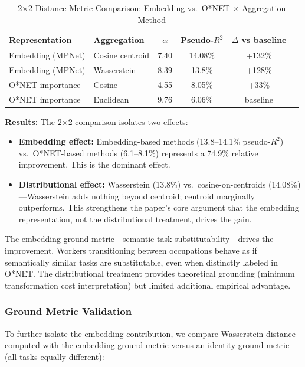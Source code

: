 \documentclass[12pt]{article}
\begin{document}
\begin{table}[h!]
\centering
\caption{2$\times$2 Distance Metric Comparison: Embedding vs.\ O*NET $\times$ Aggregation Method}
\label{tab:2x2-comparison}
\begin{tabular}{llcccc}
\toprule
\textbf{Representation} & \textbf{Aggregation} & $\alpha$ & Pseudo-$R^2$ & $\Delta$ vs baseline \\
\midrule
Embedding (MPNet) & Cosine centroid & 7.40 & 14.08\% & +132\% \\
Embedding (MPNet) & Wasserstein & 8.39 & 13.8\% & +128\% \\
O*NET importance & Cosine & 4.55 & 8.05\% & +33\% \\
O*NET importance & Euclidean & 9.76 & 6.06\% & baseline \\
\bottomrule
\end{tabular}
\end{table}


\textbf{Results:} The 2$\times$2 comparison isolates two effects:
\begin{itemize}
    \item \textbf{Embedding effect:} Embedding-based methods (13.8--14.1\% pseudo-$R^2$) vs.\ O*NET-based methods (6.1--8.1\%) represents a 74.9\% relative improvement. This is the dominant effect.
    \item \textbf{Distributional effect:} Wasserstein (13.8\%) vs.\ cosine-on-centroids (14.08\%)---Wasserstein adds nothing beyond centroid; centroid marginally outperforms. This strengthens the paper's core argument that the embedding representation, not the distributional treatment, drives the gain.
\end{itemize}

The embedding ground metric---semantic task substitutability---drives the improvement. Workers transitioning between occupations behave as if semantically similar tasks are substitutable, even when distinctly labeled in O*NET. The distributional treatment provides theoretical grounding (minimum transformation cost interpretation) but limited additional empirical advantage.


\subsubsection{Ground Metric Validation}


To further isolate the embedding contribution, we compare Wasserstein distance computed with the embedding ground metric versus an identity ground metric (all tasks equally different):
\end{document}
